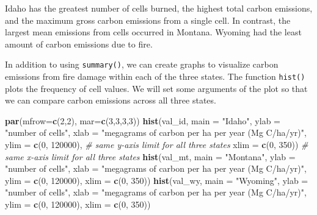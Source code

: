 \documentclass[
]{article}
\newenvironment{Shaded}{\begin{snugshade}}{\end{snugshade}}
\newcommand{\AttributeTok}[1]{\textcolor[rgb]{0.13,0.29,0.53}{#1}}
\newcommand{\CommentTok}[1]{\textcolor[rgb]{0.56,0.35,0.01}{\textit{#1}}}
\newcommand{\DecValTok}[1]{\textcolor[rgb]{0.00,0.00,0.81}{#1}}
\newcommand{\FunctionTok}[1]{\textcolor[rgb]{0.13,0.29,0.53}{\textbf{#1}}}
\newcommand{\NormalTok}[1]{#1}
\newcommand{\StringTok}[1]{\textcolor[rgb]{0.31,0.60,0.02}{#1}}
\begin{document}
Idaho has the greatest number of cells burned, the highest total carbon
emissions, and the maximum gross carbon emissions from a single cell. In
contrast, the largest mean emissions from cells occurred in Montana.
Wyoming had the least amount of carbon emissions due to fire.

In addition to using \texttt{summary()}, we can create graphs to
visualize carbon emissions from fire damage within each of the three
states. The function \texttt{hist()} plots the frequency of cell values.
We will set some arguments of the plot so that we can compare carbon
emissions across all three states.

\begin{Shaded}
\begin{Highlighting}[]
\FunctionTok{par}\NormalTok{(}\AttributeTok{mfrow=}\FunctionTok{c}\NormalTok{(}\DecValTok{2}\NormalTok{,}\DecValTok{2}\NormalTok{), }\AttributeTok{mar=}\FunctionTok{c}\NormalTok{(}\DecValTok{3}\NormalTok{,}\DecValTok{3}\NormalTok{,}\DecValTok{3}\NormalTok{,}\DecValTok{3}\NormalTok{)) }
\FunctionTok{hist}\NormalTok{(val\_id, }
     \AttributeTok{main =} \StringTok{"Idaho"}\NormalTok{, }
     \AttributeTok{ylab =} \StringTok{"number of cells"}\NormalTok{, }
     \AttributeTok{xlab =} \StringTok{"megagrams of carbon per ha per year (Mg C/ha/yr)"}\NormalTok{, }
     \AttributeTok{ylim =} \FunctionTok{c}\NormalTok{(}\DecValTok{0}\NormalTok{, }\DecValTok{120000}\NormalTok{),  }\CommentTok{\# same y{-}axis limit for all three states}
     \AttributeTok{xlim =} \FunctionTok{c}\NormalTok{(}\DecValTok{0}\NormalTok{, }\DecValTok{350}\NormalTok{))  }\CommentTok{\# same x{-}axis limit for all three states}
\FunctionTok{hist}\NormalTok{(val\_mt, }
     \AttributeTok{main =} \StringTok{"Montana"}\NormalTok{, }
     \AttributeTok{ylab =} \StringTok{"number of cells"}\NormalTok{, }
     \AttributeTok{xlab =} \StringTok{"megagrams of carbon per ha per year (Mg C/ha/yr)"}\NormalTok{, }
     \AttributeTok{ylim =} \FunctionTok{c}\NormalTok{(}\DecValTok{0}\NormalTok{, }\DecValTok{120000}\NormalTok{), }
     \AttributeTok{xlim =} \FunctionTok{c}\NormalTok{(}\DecValTok{0}\NormalTok{, }\DecValTok{350}\NormalTok{)) }
\FunctionTok{hist}\NormalTok{(val\_wy, }
     \AttributeTok{main =} \StringTok{"Wyoming"}\NormalTok{, }
     \AttributeTok{ylab =} \StringTok{"number of cells"}\NormalTok{, }
     \AttributeTok{xlab =} \StringTok{"megagrams of carbon per ha per year (Mg C/ha/yr)"}\NormalTok{, }
     \AttributeTok{ylim =} \FunctionTok{c}\NormalTok{(}\DecValTok{0}\NormalTok{, }\DecValTok{120000}\NormalTok{), }
     \AttributeTok{xlim =} \FunctionTok{c}\NormalTok{(}\DecValTok{0}\NormalTok{, }\DecValTok{350}\NormalTok{)) }
\end{Highlighting}
\end{Shaded}
\end{document}
